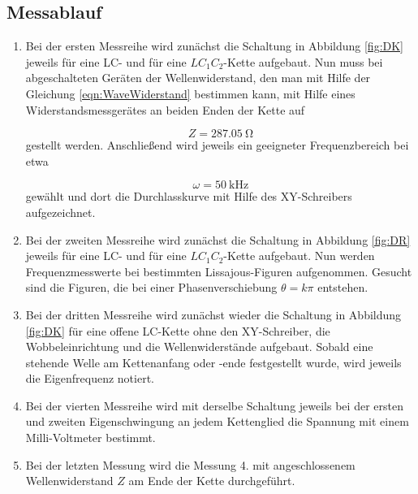 \subsection{Messablauf}

\begin{enumerate}

\item
Bei der ersten Messreihe wird zunächst die Schaltung in Abbildung
\ref{fig:DK} jeweils für eine LC- und für eine $LC_1C_2$-Kette aufgebaut.
Nun muss
bei abgeschalteten Geräten der Wellenwiderstand, den man mit Hilfe der
Gleichung \eqref{eqn:WaveWiderstand} bestimmen kann, mit Hilfe eines
Widerstandsmessgerätes
an beiden Enden der Kette auf

\begin{equation}
Z = \SI{287.05}{\ohm}
\end{equation}
gestellt werden.
Anschließend wird jeweils ein geeigneter Frequenzbereich bei etwa

\begin{equation}
\omega = \SI{50}{\kilo\Hz}
\end{equation}
gewählt und dort die Durchlasskurve mit Hilfe des
XY-Schreibers aufgezeichnet.

\item
Bei der zweiten Messreihe wird zunächst die Schaltung in Abbildung
\ref{fig:DR} jeweils für eine LC- und für eine $LC_1C_2$-Kette aufgebaut.
Nun werden Frequenzmesswerte bei bestimmten Lissajous-Figuren aufgenommen.
Gesucht sind die Figuren, die bei einer Phasenverschiebung $\theta = k\pi$
entstehen.

\item
Bei der dritten Messreihe wird zunächst wieder die Schaltung in Abbildung
\ref{fig:DK} für eine offene LC-Kette ohne den XY-Schreiber, die
Wobbeleinrichtung und die Wellenwiderstände aufgebaut. Sobald eine
stehende Welle am Kettenanfang oder -ende festgestellt wurde, wird jeweils
die Eigenfrequenz notiert.

\item
Bei der vierten Messreihe wird mit derselbe Schaltung jeweils bei der ersten und
zweiten Eigenschwingung an jedem Kettenglied die Spannung mit einem
Milli-Voltmeter bestimmt.

\item
Bei der letzten Messung wird die Messung 4. mit angeschlossenem Wellenwiderstand
$Z$ am Ende der Kette durchgeführt.

\end{enumerate}
